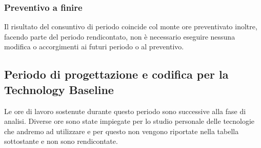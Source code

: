 \subsubsection{Preventivo a finire}
Il risultato del consuntivo di periodo coincide col monte ore preventivato inoltre, facendo parte del periodo rendicontato, non è necessario eseguire nessuna modifica o accorgimenti ai futuri periodo o al preventivo.

\subsection{Periodo di progettazione e codifica per la Technology Baseline}
Le ore di lavoro sostenute durante questo periodo sono successive alla fase di analisi. Diverse ore sono state impiegate per lo studio personale delle tecnologie che andremo ad utilizzare e per questo non vengono riportate nella tabella sottostante e non sono rendicontate.


